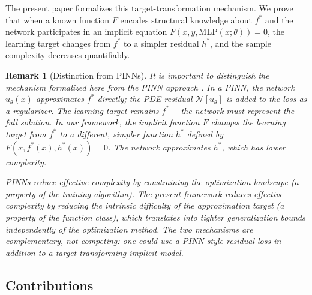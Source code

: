 \documentclass[12pt]{article}
\newtheorem{remark}{Remark}
\newcommand{\MLP}{\mathrm{MLP}}
\begin{document}
The present paper formalizes this target-transformation mechanism.
We prove that when a known function $F$ encodes structural knowledge
about $f^*$ and the network participates in an implicit equation
$F(x, y, \MLP(x;\theta)) = 0$, the learning target changes from
$f^*$ to a simpler residual $h^*$, and the sample complexity
decreases quantifiably.

\begin{remark}[Distinction from PINNs]
\label{rem:pinn_distinction}
It is important to distinguish the mechanism formalized here from the
PINN approach \cite{Raissi2019}.
In a PINN, the network $u_\theta(x)$ approximates $f^*$ directly;
the PDE residual $\mathcal{N}[u_\theta]$ is added to the loss as a
regularizer.
The learning target remains $f^* $--- the network must represent the
full solution.
In our framework, the implicit function $F$ \emph{changes} the
learning target from $f^*$ to a different, simpler function
$h^*$ defined by $F(x, f^*(x), h^*(x)) = 0$.
The network approximates $h^*$, which has lower complexity.

PINNs reduce effective complexity by constraining the optimization
landscape (a property of the training algorithm).
The present framework reduces effective complexity by reducing the
\emph{intrinsic difficulty of the approximation target} (a property
of the function class), which translates into tighter generalization
bounds independently of the optimization method.
The two mechanisms are complementary, not competing: one could use a
PINN-style residual loss \emph{in addition to} a target-transforming
implicit model.
\end{remark}

\subsection{Contributions}
\end{document}
